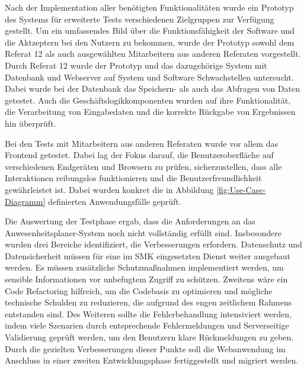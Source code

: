 Nach der Implementation aller benötigten Funktionalitäten wurde ein Prototyp des Systems für erweiterte Tests verschiedenen Zielgruppen zur Verfügung gestellt. Um ein umfassendes Bild über die Funktionsfähigkeit der Software und die Aktzeptern bei den Nutzern zu bekommen, wurde der Prototyp sowohl dem Referat 12 als auch ausgewählten Mitarbeitern aus anderen Referaten vorgestellt. Durch Referat 12 wurde der Prototyp und das dazugehörige System mit Datenbank und Webserver auf System und Software Schwachstellen untersucht. Dabei wurde bei der Datenbank das Speichern- als auch das Abfragen von Daten getestet. Auch die Geschäftslogikkomponenten wurden auf ihre Funktionalität, die Verarbeitung von Eingabedaten und die korrekte Rückgabe von Ergebnissen hin überprüft.

Bei den Tests mit Mitarbeitern aus anderen Referaten wurde vor allem das Frontend getestet. Dabei lag der Fokus darauf, die Benutzeroberfläche auf verschiedenen Endgeräten und Browsern zu prüfen, sicherzustellen, dass alle Interaktionen reibungslos funktionieren und die Benutzerfreundlichkeit gewährleistet ist. Dabei wurden konkret die in Abbildung \ref{fig:Use-Case-Diagramm} definierten Anwendungsfälle geprüft.

Die Auswertung der Testphase ergab, dass die Anforderungen an das Anwesenheitsplaner-System noch nicht vollständig erfüllt sind. Insbesondere wurden drei Bereiche identifiziert, die Verbesserungen erfordern. Datenschutz und Datensicherheit müssen für eine im SMK eingesetzten Dienst weiter ausgebaut werden. Es müssen zusätzliche Schutzmaßnahmen implementiert werden, um sensible Informationen vor unbefugtem Zugriff zu schützen. Zweitens wäre ein Code Refactoring hilfreich, um die Codebasis zu optimieren und mögliche technische Schulden zu reduzieren, die aufgrund des engen zeitlichem Rahmens entstanden sind. Des Weiteren sollte die Fehlerbehandlung intensiviert werden, indem viele Szenarien durch entsprechende Fehlermeldungen und Serverseitige Validierung geprüft werden, um den Benutzern klare Rückmeldungen zu geben. Durch die gezielten Verbesserungen dieser Punkte soll die Webanwendung im Anschluss in einer zweiten Entwicklungsphase fertiggestellt und migriert werden.
